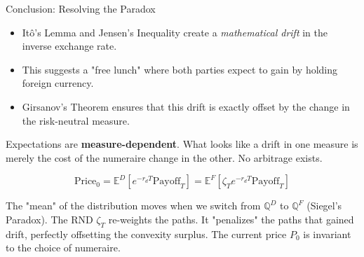 \documentclass{beamer}
\begin{document}
\begin{frame}{Conclusion: Resolving the Paradox }
	\begin{itemize}
		\item Itô's Lemma and Jensen's Inequality create a \textit{mathematical drift} in the inverse exchange rate.
		\item This suggests a "free lunch" where both parties expect to gain by holding foreign currency.
		\item Girsanov's Theorem ensures that this drift is exactly offset by the change in the risk-neutral measure.
	\end{itemize}
			\vfill
	\begin{tcolorbox}[colback=gray!5, colframe=maincolor, arc=0mm, boxrule=0.5pt]
		\footnotesize
		Expectations are \textbf{measure-dependent}. What looks like a drift in one measure is merely the cost of the numeraire change in the other. No arbitrage exists.

		\[ \text{Price}_0 = \mathbb{E}^D \left[ e^{-r_d T} \text{Payoff}_T \right] = \mathbb{E}^F \left[ \zeta_T e^{-r_d T} \text{Payoff}_T \right] \]

		The "mean" of the distribution moves when we switch from $\mathbb{Q}^D$ to $\mathbb{Q}^F$ (Siegel's Paradox). The RND $\zeta_T$ re-weights the paths. It "penalizes" the paths that gained drift, perfectly offsetting the convexity surplus. The current price $P_0$ is invariant to the choice of numeraire.
	\end{tcolorbox}
\end{frame}


\end{document}
